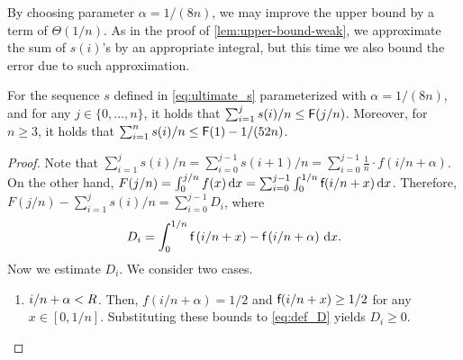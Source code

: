 By choosing parameter $\alpha = 1/(8n)$, 
we may improve the upper bound by a term of $\Theta(1/n)$.
As in the proof of \cref{lem:upper-bound-weak}, 
we approximate the sum of $s(i)$'s by an appropriate integral, but 
this time we also bound the error due to such approximation.

\begin{lemma}
\label{lem:upper-bound-technical}
For the sequence $s$ defined in \eqref{eq:ultimate_s} parameterized
with $\alpha = 1/(8n)$, and for any $j \in \{0,\ldots,n\}$,
it holds that 
$\sum_{i=1}^j s(i)/n \leq \textsf{F}(j/n)$.
Moreover, for $n \geq 3$, it holds that 
$\sum_{i=1}^n s(i)/n \leq \textsf{F}(1) - 1/(52 n)$.
\end{lemma}

\begin{proof}
Note that $\sum_{i = 1}^j s(i)/n
= \sum_{i = 0}^{j-1} s(i+1) / n
 = \sum_{i = 0}^{j-1} \frac{1}{n} \cdot f(i/n+\alpha )$.
On the other hand, 
$F(j/n) = \int_0^{j/n} f(x) \,\mathrm{d} x = \sum_{i = 0}^{j-1} \int_{0}^{1/n} \textsf{f}(i/n + x) \,\mathrm{d} x$.
Therefore, $F(j/n) - \sum_{i = 1}^j s(i)/n = \sum_{i=0}^{j-1} D_i$, where 
\begin{equation}
\label{eq:def_D}
  D_i = \int_{0}^{1/n} \textsf{f}\left( i/n + x \right) 
      - \textsf{f}\left( i/n + \alpha \right) \,\mathrm{d} x .
\end{equation}
Now we estimate $D_i$. We consider two cases.
\begin{enumerate}
\item  $i/n + \alpha < R$. Then, $f(i/n+\alpha) = 1/2$ and 
$\textsf{f}(i/n+x) \geq 1/2$ for any $x \in [0,1/n]$. Substituting these bounds 
to \eqref{eq:def_D} yields $D_i \geq 0$. 


\end{enumerate}
\end{proof}
